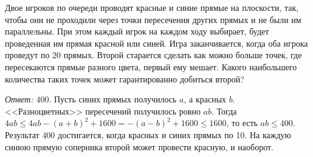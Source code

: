 \problem
Двое игроков по очереди проводят красные и синие прямые на плоскости, так,
чтобы они не проходили через точки пересечения других прямых и не были им
параллельны.
При этом каждый игрок на каждом ходу выбирает, будет проведенная им прямая
красной или синей.
Игра заканчивается, когда оба игрока проведут по $20$ прямых.
Второй старается сделать как можно больше точек, где пересекаются прямые
разного цвета, первый ему мешает.
Какого наибольшего количества таких точек может гарантированно добиться второй?

\solution
\emph{Ответ:}
$400$.
Пусть синих прямых получилось $a$, а красных $b$.
<<Разноцветных>> пересечений получилось ровно $a b$.
Тогда
\(
    4 a b
\leq
    4 a b - (a + b)^2 + 1600
=
    -(a - b)^2 + 1600
\leq
    1600
\),
то есть $a b \leq 400$.
Результат $400$ достигается, когда красных и синих прямых по 10.
На каждую синюю прямую соперника второй может провести красную, и наоборот.

\endproblem
